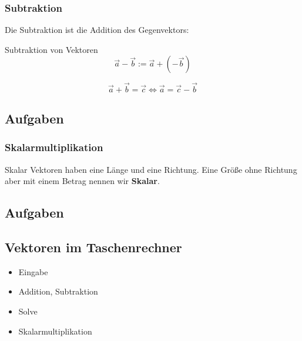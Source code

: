 \subsubsection{Subtraktion}
Die Subtraktion ist die Addition des Gegenvektors:

\begin{definition}{Subtraktion von Vektoren}{}
  $$\vec{a} - \vec{b} := \vec{a} + (-\vec{b})$$
\end{definition}

\begin{bemerkung}{}{}
  $$\vec{a} + \vec{b} = \vec{c} \Longleftrightarrow \vec{a} = \vec{c} - \vec{b}$$
  \end{bemerkung}

\subsection*{Aufgaben}
\newpage

\subsubsection{Skalarmultiplikation}
\begin{definition}{Skalar}{}
  Vektoren haben eine Länge und eine Richtung. Eine Größe ohne
  Richtung aber mit einem Betrag nennen wir \textbf{Skalar}. 
\end{definition}
\newpage


\subsection*{Aufgaben}

\newpage

\subsection{Vektoren im Taschenrechner}

\begin{itemize}
\item Eingabe
\item Addition, Subtraktion
\item Solve
\item Skalarmultiplikation
\end{itemize}

